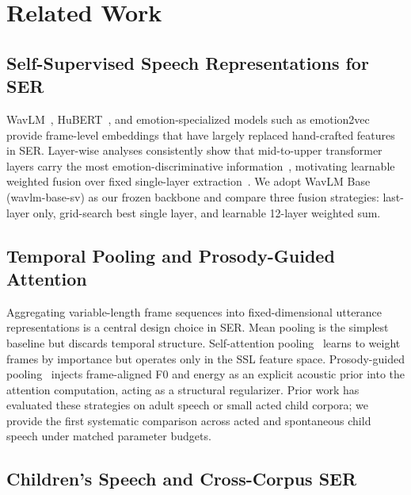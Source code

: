 
\section{Related Work}
\label{sec:related_work}

\subsection{Self-Supervised Speech Representations for SER}

WavLM~\cite{chen2022wavlm}, HuBERT~\cite{hsu2021hubert}, and
emotion-specialized models such as emotion2vec~\cite{ma2024emotion2vec}
provide frame-level embeddings that have largely replaced hand-crafted features
in SER. Layer-wise analyses consistently show that mid-to-upper transformer
layers carry the most emotion-discriminative information~\cite{pasad2021layer},
motivating learnable weighted fusion over fixed single-layer
extraction~\cite{rozen2024layer}. We adopt WavLM Base (wavlm-base-sv) as our
frozen backbone and compare three fusion strategies: last-layer only,
grid-search best single layer, and learnable 12-layer weighted sum.

\subsection{Temporal Pooling and Prosody-Guided Attention}

Aggregating variable-length frame sequences into fixed-dimensional utterance
representations is a central design choice in SER. Mean pooling is the
simplest baseline but discards temporal structure. Self-attention
pooling~\cite{lin2017structured} learns to weight frames by importance but
operates only in the SSL feature space. Prosody-guided
pooling~\cite{triantafyllopoulos2023prosody} injects frame-aligned F0 and
energy as an explicit acoustic prior into the attention computation, acting as
a structural regularizer. Prior work has evaluated these strategies on adult
speech or small acted child corpora; we provide the first systematic comparison
across acted and spontaneous child speech under matched parameter budgets.

\subsection{Children's Speech and Cross-Corpus SER}


